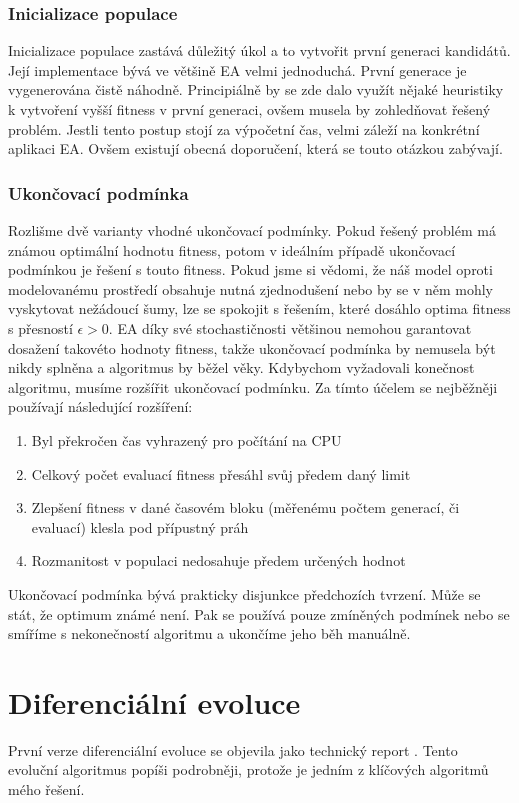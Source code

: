 \subsubsection{Inicializace populace}
Inicializace populace zastává důležitý úkol a to vytvořit první generaci kandidátů. Její implementace bývá ve většině EA velmi jednoduchá. První generace je vygenerována čistě náhodně. Principiálně by se zde dalo využít nějaké heuristiky k vytvoření vyšší fitness v první generaci, ovšem musela by zohledňovat řešený problém. Jestli tento postup stojí za výpočetní čas, velmi záleží na konkrétní aplikaci EA. Ovšem existují obecná doporučení, která se touto otázkou zabývají. 
\subsubsection{Ukončovací podmínka}
Rozlišme dvě varianty vhodné ukončovací podmínky. Pokud řešený problém má známou optimální hodnotu fitness, potom v ideálním případě ukončovací podmínkou je řešení s touto fitness. Pokud jsme si vědomi, že náš model oproti modelovanému prostředí obsahuje nutná zjednodušení nebo by se v něm mohly vyskytovat nežádoucí šumy, lze se spokojit s řešením, které dosáhlo optima fitness s přesností $\epsilon > 0$. EA díky své stochastičnosti většinou nemohou garantovat dosažení takovéto hodnoty fitness, takže ukončovací podmínka by nemusela být nikdy splněna a algoritmus by běžel věky. Kdybychom vyžadovali konečnost algoritmu, musíme rozšířit ukončovací podmínku. Za tímto účelem se nejběžněji používají následující rozšíření: \par
\begin{enumerate}
\item Byl překročen čas vyhrazený pro počítání na CPU
\item Celkový počet evaluací fitness přesáhl svůj předem daný limit 
\item Zlepšení fitness v dané časovém bloku (měřenému počtem generací, či evaluací) klesla pod přípustný práh
\item Rozmanitost v populaci nedosahuje předem určených hodnot
\end{enumerate}
Ukončovací podmínka bývá prakticky disjunkce předchozích tvrzení. Může se stát, že optimum známé není. Pak se používá pouze zmíněných podmínek nebo se smíříme s nekonečností algoritmu a ukončíme jeho běh manuálně.

\section{Diferenciální evoluce}
\label{sec:DE}
První verze diferenciální evoluce se objevila jako technický report \cite{storn1997differential}. Tento evoluční algoritmus popíši podrobněji, protože je jedním z klíčových algoritmů mého řešení.

